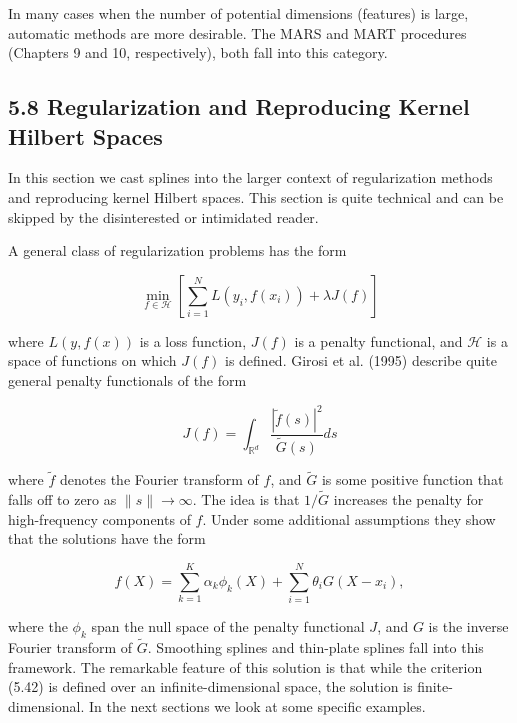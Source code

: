 \documentclass[10pt]{article}
\begin{document}
In many cases when the number of potential dimensions (features) is large, automatic methods are more desirable. The MARS and MART procedures (Chapters 9 and 10, respectively), both fall into this category.

\subsection*{5.8 Regularization and Reproducing Kernel Hilbert Spaces}
In this section we cast splines into the larger context of regularization methods and reproducing kernel Hilbert spaces. This section is quite technical and can be skipped by the disinterested or intimidated reader.

A general class of regularization problems has the form


\begin{equation*}
\min _{f \in \mathcal{H}}\left[\sum_{i=1}^{N} L\left(y_{i}, f\left(x_{i}\right)\right)+\lambda J(f)\right] \tag{5.42}
\end{equation*}


where $L(y, f(x))$ is a loss function, $J(f)$ is a penalty functional, and $\mathcal{H}$ is a space of functions on which $J(f)$ is defined. Girosi et al. (1995) describe quite general penalty functionals of the form


\begin{equation*}
J(f)=\int_{\mathbb{R}^{d}} \frac{|\tilde{f}(s)|^{2}}{\tilde{G}(s)} d s \tag{5.43}
\end{equation*}


where $\tilde{f}$ denotes the Fourier transform of $f$, and $\tilde{G}$ is some positive function that falls off to zero as $\|s\| \rightarrow \infty$. The idea is that $1 / \tilde{G}$ increases the penalty for high-frequency components of $f$. Under some additional assumptions they show that the solutions have the form


\begin{equation*}
f(X)=\sum_{k=1}^{K} \alpha_{k} \phi_{k}(X)+\sum_{i=1}^{N} \theta_{i} G\left(X-x_{i}\right), \tag{5.44}
\end{equation*}


where the $\phi_{k}$ span the null space of the penalty functional $J$, and $G$ is the inverse Fourier transform of $\tilde{G}$. Smoothing splines and thin-plate splines fall into this framework. The remarkable feature of this solution is that while the criterion (5.42) is defined over an infinite-dimensional space, the solution is finite-dimensional. In the next sections we look at some specific examples.
\end{document}
